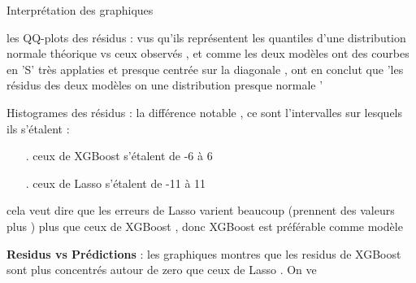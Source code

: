 \begin{frame}[allowframebreaks]{Interprétation des graphiques}
    
    les QQ-plots des résidus :  vus qu'ils représentent les quantiles d'une distribution normale théorique vs ceux observés , et comme les deux modèles ont des courbes en 'S' très applaties et presque centrée sur la diagonale , ont en conclut que 'les résidus des deux modèles on une distribution  presque normale '
                
    \framebreak        
    Histogrames des résidus : la différence notable , ce sont l'intervalles sur lesquels ils s'étalent :
        \begin{itemize}
            \item[.] ceux de XGBoost s'étalent de -6 à 6
            \item[.] ceux de Lasso s'étalent de -11 à 11
        \end{itemize}

        cela veut dire que les erreurs de Lasso varient beaucoup (prennent des valeurs plus ) plus que ceux de XGBoost , donc XGBoost est préférable comme modèle

    \framebreak

    \textbf{ Residus vs Prédictions} : les graphiques montres que les residus de XGBoost sont plus concentrés autour de zero que ceux de Lasso . On ve
    
    \framebreak

    \textbf{}
\end{frame}
